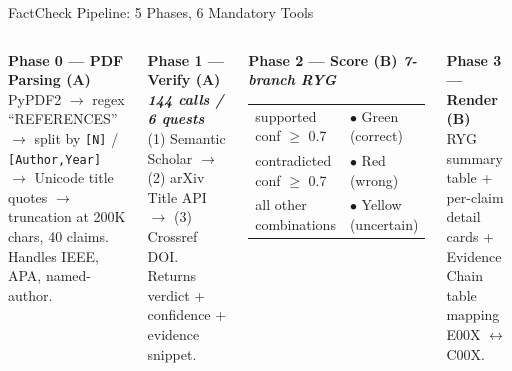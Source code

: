 \documentclass[aspectratio=169,11pt]{beamer}
\begin{document}
\begin{frame}{FactCheck Pipeline: 5 Phases, 6 Mandatory Tools}
  \begin{columns}[T]
    \setlength{\fboxsep}{4pt}
    \colorbox{blue!18}{\begin{minipage}{\dimexpr\linewidth-2\fboxsep\relax}
      \footnotesize
      \textbf{Phase 0 --- PDF Parsing (A)}\\[2pt]
      PyPDF2 $\to$ regex ``REFERENCES'' $\to$ split by \texttt{[N]} / \texttt{[Author,Year]} $\to$ Unicode title quotes $\to$ truncation at 200K chars, 40 claims. Handles IEEE, APA, named-author.
    \end{minipage}}

    \vspace{0.1cm}
    \colorbox{blue!12}{\begin{minipage}{\dimexpr\linewidth-2\fboxsep\relax}
      \footnotesize
      \textbf{Phase 1 --- Verify (A) \hspace{0.2cm} \textit{144 calls / 6 quests}}\\[2pt]
      (1) Semantic Scholar $\to$ (2) arXiv Title API $\to$ (3) Crossref DOI. Returns verdict + confidence + evidence snippet.
    \end{minipage}}

    \vspace{0.1cm}
    \colorbox{green!18}{\begin{minipage}{\dimexpr\linewidth-2\fboxsep\relax}
      \footnotesize
      \textbf{Phase 2 --- Score (B) \hspace{0.2cm} \textit{7-branch RYG}}\\[2pt]
      \begin{tabular}{ll}
        supported conf $\ge$ 0.7 & \textcolor{greenRYG}{$\bullet$} Green (correct) \\
        contradicted conf $\ge$ 0.7 & \textcolor{redRYG}{$\bullet$} Red (wrong) \\
        all other combinations & \textcolor{yellowRYG}{$\bullet$} Yellow (uncertain) \\
      \end{tabular}
    \end{minipage}}

    \colorbox{green!14}{\begin{minipage}{\dimexpr\linewidth-2\fboxsep\relax}
      \footnotesize
      \textbf{Phase 3 --- Render (B)}\\[2pt]
      RYG summary table + per-claim detail cards + Evidence Chain table mapping E00X $\leftrightarrow$ C00X.
    \end{minipage}}


\end{columns}
\end{frame}
\end{document}

